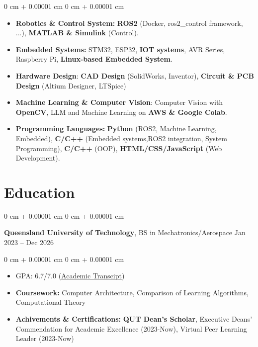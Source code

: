 \documentclass[10pt, letterpaper]{article}
\newenvironment{highlights}{
    \begin{itemize}[
        topsep=0.10 cm,
        parsep=0.10 cm,
        partopsep=0pt,
        itemsep=0pt,
        leftmargin=0 cm + 10pt
    ]
}{
    \end{itemize}
} %
\newenvironment{highlightsforbulletentries}{
    \begin{itemize}[
        topsep=0.10 cm,
        parsep=0.10 cm,
        partopsep=0pt,
        itemsep=0pt,
        leftmargin=10pt
    ]
}{
    \end{itemize}
} %
\newenvironment{onecolentry}{
    \begin{adjustwidth}{
        0 cm + 0.00001 cm
    }{
        0 cm + 0.00001 cm
    }
}{
    \end{adjustwidth}
} %
\newenvironment{twocolentry}[2][]{
    \onecolentry
    \def\secondColumn{#2}
    \setcolumnwidth{\fill, 4.5 cm}
    \begin{paracol}{2}
}{
    \switchcolumn \raggedleft \secondColumn
    \end{paracol}
    \endonecolentry
} %
\begin{document}
\begin{onecolentry}
      \begin{highlightsforbulletentries}

            \item \textbf{Robotics \& Control System:} \textbf{ROS2} (Docker, ros2\_control framework, ...), \textbf{MATLAB \& Simulink} (Control).
            \item \textbf{Embedded Systems:} STM32, ESP32, \textbf{IOT systems}, AVR Series, Raspberry Pi, \textbf{Linux-based Embedded System}.
            \item \textbf{Hardware Design}: \textbf{CAD Design} (SolidWorks, Inventor), \textbf{Circuit \& PCB Design} (Altium Designer, LTSpice)
            \item \textbf{Machine Learning \& Computer Vision}: Computer Vision with \textbf{OpenCV},
            LLM and Machine Learning on \textbf{AWS \& Google Colab}.
            \item \textbf{Programming Languages:} \textbf{Python} (ROS2, Machine Learning, Embedded),
            \textbf{C/C++} (Embedded systems,ROS2 integration, System Programming), \textbf{C/C++} (OOP),
            \textbf{HTML/CSS/JavaScript} (Web Development).

      \end{highlightsforbulletentries}
\end{onecolentry}

\section{Education}

\begin{twocolentry}{
            Jan 2023 – Dec 2026
      }
      \textbf{Queensland University of Technology}, BS in Mechatronics/Aerospace\end{twocolentry}

\vspace{0.10 cm}
\begin{onecolentry}
      \begin{highlights}
            \item GPA: 6.7/7.0 (\href{https://example.com}{Academic Transcipt})
            \item \textbf{Coursework:} Computer Architecture, Comparison of Learning Algorithms, Computational Theory
            \item \textbf{Achivements \& Certifications:} \textbf{QUT Dean's Scholar},
            Executive Deans' Commendation for Academic Excellence (2023-Now),
            Virtual Peer Learning Leader (2023-Now)

      \end{highlights}
\end{onecolentry}
\end{document}
